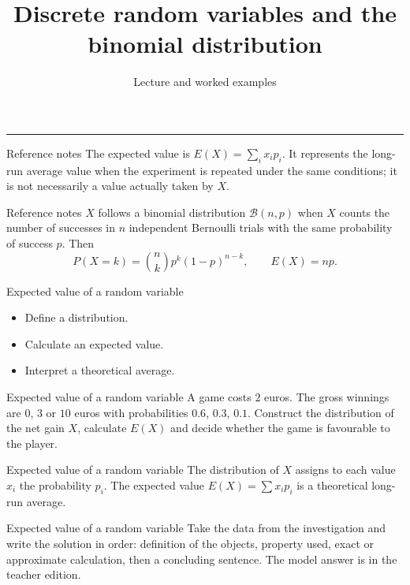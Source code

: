 \documentclass[aspectratio=169,10pt]{beamer}
\title{Discrete random variables and the binomial distribution}
\subtitle{Lecture and worked examples}
\date{}
\author{}
\begin{document}
\begin{frame}[plain]
\vfill
{\inserttitle\par}
\medskip
{\insertsubtitle\par}
\medskip
{\rule{\textwidth}{.5pt}}
\vfill
\end{frame}
\begin{frame}{Reference notes}
The expected value is \(E(X)=\sum_i x_ip_i\). It represents the long-run average value when the experiment is repeated under the same conditions; it is not necessarily a value actually taken by \(X\).
\end{frame}
\begin{frame}{Reference notes}
\(X\) follows a binomial distribution \(\mathcal B(n,p)\) when \(X\) counts the number of successes in \(n\) independent Bernoulli trials with the same probability of success \(p\). Then
\[
P(X=k)=\binom nk p^k(1-p)^{n-k},\qquad E(X)=np.
\]
\end{frame}
\begin{frame}{Expected value of a random variable}
\begin{itemize}
\item Define a distribution.
\item Calculate an expected value.
\item Interpret a theoretical average.

\end{itemize}
\end{frame}
\begin{frame}{Expected value of a random variable}
A game costs \(2\) euros. The gross winnings are \(0\), \(3\) or \(10\) euros with probabilities \(0.6\), \(0.3\), \(0.1\). Construct the distribution of the net gain \(X\), calculate \(E(X)\) and decide whether the game is favourable to the player.
\end{frame}
\begin{frame}{Expected value of a random variable}
The distribution of \(X\) assigns to each value \(x_i\) the probability \(p_i\). The expected value \(E(X)=\sum x_ip_i\) is a theoretical long-run average.
\end{frame}
\begin{frame}{Expected value of a random variable}
Take the data from the investigation and write the solution in order: definition of the objects, property used, exact or approximate calculation, then a concluding sentence. The model answer is in the teacher edition.
\end{frame}
\end{document}
